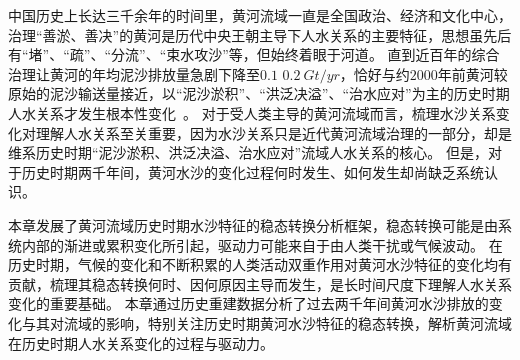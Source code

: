 

中国历史上长达三千余年的时间里，黄河流域一直是全国政治、经济和文化中心，治理“善淤、善决”的黄河是历代中央王朝主导下人\textendash{}水关系的主要特征，思想虽先后有“堵”、“疏”、“分流”、“束水攻沙”等，但始终着眼于河道\cite{WangWeiJing2009}。
直到近百年的综合治理让黄河的年均泥沙排放量急剧下降至$0.1$ \textendash{} $0.2~Gt/yr$，恰好与约$2000$年前黄河较原始的泥沙输送量接近，以“泥沙淤积”、“洪泛决溢”、“治水应对”为主的历史时期人\textendash{}水关系才发生根本性变化~\cite{wang2007,song2020}。
对于受人类主导的黄河流域而言，梳理水沙关系变化对理解人\textendash{}水关系至关重要，因为水沙关系只是近代黄河流域治理的一部分，却是维系历史时期“泥沙淤积、洪泛决溢、治水应对”流域人\textendash{}水关系的核心。
但是，对于历史时期两千年间，黄河水沙的变化过程何时发生、如何发生却尚缺乏系统认识。


本章发展了黄河流域历史时期水沙特征的稳态转换分析框架，稳态转换可能是由系统内部的渐进或累积变化所引起，驱动力可能来自于由人类干扰或气候波动。
在历史时期，气候的变化和不断积累的人类活动双重作用对黄河水沙特征的变化均有贡献，梳理其稳态转换何时、因何原因主导而发生，是长时间尺度下理解人\textendash{}水关系变化的重要基础。
本章通过历史重建数据分析了过去两千年间黄河水沙排放的变化与其对流域的影响，特别关注历史时期黄河水沙特征的稳态转换，解析黄河流域在历史时期人\textendash{}水关系变化的过程与驱动力。



